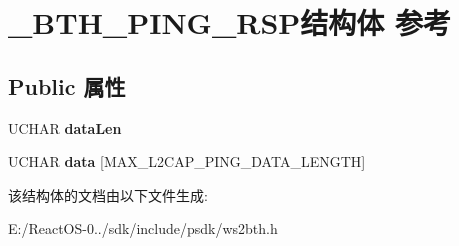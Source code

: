 \hypertarget{struct___b_t_h___p_i_n_g___r_s_p}{}\section{\+\_\+\+B\+T\+H\+\_\+\+P\+I\+N\+G\+\_\+\+R\+S\+P结构体 参考}
\label{struct___b_t_h___p_i_n_g___r_s_p}
\subsection*{Public 属性}
\begin{DoxyCompactItemize}
\item 
\mbox{\label{struct___b_t_h___p_i_n_g___r_s_p_a4ae1032139b14f63c7b383961d9cc0f4}} 
U\+C\+H\+AR {\bfseries data\+Len}
\item 
\mbox{\label{struct___b_t_h___p_i_n_g___r_s_p_af5388e2751b8c5fbe1c0739315e9af42}} 
U\+C\+H\+AR {\bfseries data} \mbox{[}M\+A\+X\+\_\+\+L2\+C\+A\+P\+\_\+\+P\+I\+N\+G\+\_\+\+D\+A\+T\+A\+\_\+\+L\+E\+N\+G\+TH\mbox{]}
\end{DoxyCompactItemize}


该结构体的文档由以下文件生成\+:\begin{DoxyCompactItemize}
\item 
E\+:/\+React\+O\+S-\/0../sdk/include/psdk/ws2bth.\+h\end{DoxyCompactItemize}
